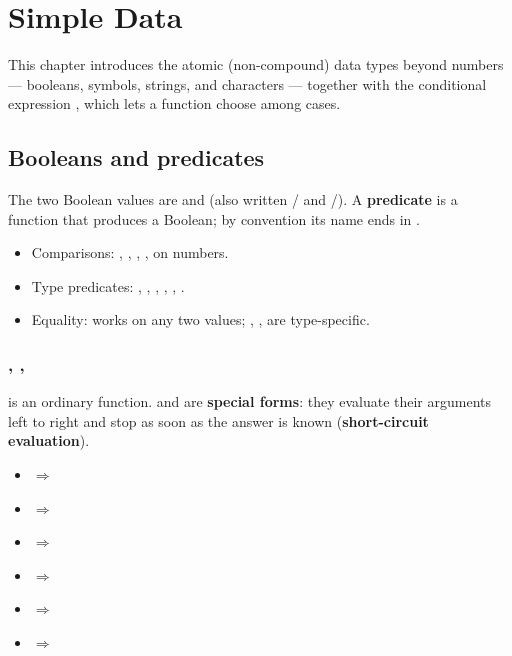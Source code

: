 \chapter{Simple Data}

This chapter introduces the atomic (non-compound) data types beyond numbers ---
booleans, symbols, strings, and characters --- together with the conditional
expression , which lets a function choose among cases.

\section{Booleans and predicates}

The two Boolean values are  and  (also written
/ and /). A \textbf{predicate}
is a function that produces a Boolean; by convention its name ends in .

\begin{itemize}
  \item Comparisons: \code{=}, \code{<}, \code{<=}, \code{>}, \code{>=} on numbers.
  \item Type predicates: , , , , , .
  \item Equality:  works on any two values; , ,  are type-specific.
\end{itemize}

\subsection{, , }
 is an ordinary function.  and  are
\textbf{special forms}: they evaluate their arguments left to right and stop as
soon as the answer is known (\textbf{short-circuit evaluation}).

\begin{important}
\begin{itemize}
  \item {} $\Rightarrow$ 
  \item {} $\Rightarrow$ 
  \item {} $\Rightarrow$ 
  \item {} $\Rightarrow$ 
  \item {} $\Rightarrow$ 
  \item {} $\Rightarrow$ 
\end{itemize}
\end{important}

